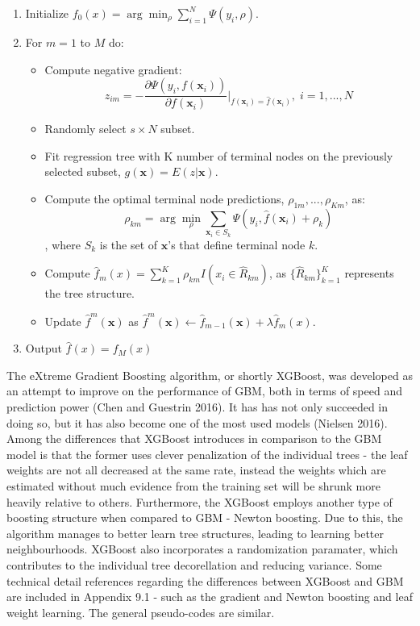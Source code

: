 \documentclass[12pt,]{article}
\providecommand{\tightlist}{%
  \setlength{\itemsep}{0pt}\setlength{\parskip}{0pt}}
\begin{document}
\begin{enumerate}
\def\labelenumi{\arabic{enumi}.}
\item
  Initialize \(f_{0}(x) = \arg\min_{\rho}\sum_{i=1}^{N}\Psi(y_i,\rho)\).
\item
  For \(m=1\) to \(M\) do:

  \begin{itemize}
  \tightlist
  \item
    Compute negative gradient:
    \[z_{im}=-\frac{\partial{\Psi(y_{i},f(\mathbf{x}_i))}}{\partial{f(\mathbf{x}_i)}}\rvert_{f(\mathbf{x}_i)=\widehat{f}(\mathbf{x}_i)},\; i=1,...,N\]
  \item
    Randomly select \(s \times N\) subset.
  \item
    Fit regression tree with K number of terminal nodes on the
    previously selected subset, \(g(\mathbf{x})=E(z|\mathbf{x})\).
  \item
    Compute the optimal terminal node predictions,
    \(\rho_{1m},...,\rho_{Km}\), as:
    \[\rho_{km}=\arg\min_{\rho}\sum_{\mathbf{x}_i \in S_k} \Psi(y_i,\widehat{f}(\mathbf{x}_{i})+\rho_k)\],
    where \(S_k\) is the set of \(\mathbf{x}\)'s that define terminal
    node \(k\).
  \item
    Compute
    \(\widehat{f}_{m}(x)=\sum_{k=1}^{K}\rho_{km}I(x_i\in\widehat{R}_{km})\),
    as \(\{\widehat{R}_{km}\}_{k=1}^{K}\) represents the tree structure.
  \item
    Update \(\widehat{f}^{m}(\mathbf{x})\) as
    \(\widehat{f}^{m}(\mathbf{x}) \leftarrow \widehat{f}_{m-1}(\mathbf{x}) + \lambda\widehat{f}_{m}(x)\).
  \end{itemize}
\item
  Output \(\widehat{f}(x) = f_{M}(x)\)
\end{enumerate}

The eXtreme Gradient Boosting algorithm, or shortly XGBoost, was
developed as an attempt to improve on the performance of GBM, both in
terms of speed and prediction power (Chen and Guestrin 2016). It has has
not only succeeded in doing so, but it has also become one of the most
used models (Nielsen 2016). Among the differences that XGBoost
introduces in comparison to the GBM model is that the former uses clever
penalization of the individual trees - the leaf weights are not all
decreased at the same rate, instead the weights which are estimated
without much evidence from the training set will be shrunk more heavily
relative to others. Furthermore, the XGBoost employs another type of
boosting structure when compared to GBM - Newton boosting. Due to this,
the algorithm manages to better learn tree structures, leading to
learning better neighbourhoods. XGBoost also incorporates a
randomization paramater, which contributes to the individual tree
decorellation and reducing variance. Some technical detail references
regarding the differences between XGBoost and GBM are included in
Appendix 9.1 - such as the gradient and Newton boosting and leaf weight
learning. The general pseudo-codes are similar.
\end{document}
